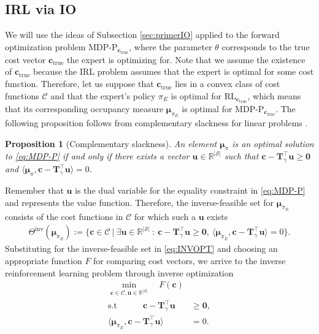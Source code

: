 \documentclass[10pt]{article} %
\newtheorem{proposition}{Proposition}
\def\C{\ensuremath{\mathcal{C}}}
\def\mTg{{\bm{T}}_\gamma}
\def\vzero{{\bm{0}}}
\def\vc{{\bm{c}}}
\def\vu{{\bm{u}}}
\def\vmu{{\bm{\mu}}}
\newcommand{\R}{\mathbb{R}}
\newcommand{\St}{\mathcal{S}}
\begin{document}
\subsection{IRL via IO}
We will use the ideas of Subsection \ref{sec:primerIO} applied to the forward optimization problem $\text{MDP-P}_{\vc_{\text{true}}}$, where the parameter $\theta$ corresponds to the true cost vector $\vc_{\text{true}}$ the expert is optimizing for. Note that we assume the existence of $\vc_{\text{true}}$ because the IRL problem assumes that the expert is optimal for some cost function. Therefore, let us suppose that $\vc_{\text{true}}$ lies in a convex class of cost functions $\C$ and that the expert's policy $\pi_E$ is optimal for $\text{RL}_{\vc_\text{true}}$, which means that its corresponding occupancy measure $\vmu_{\pi_E}$ is optimal for $\text{MDP-P}_{\vc_{\text{true}}}$. The following proposition follows from complementary slackness for linear problems \citep{Bertsimas1997}.
\begin{proposition}[Complementary slackness] \label{prop:complementaryslackness}
    An element $\vmu_{\pi}$ is an optimal solution to \eqref{eq:MDP-P} if and only if there exists a vector $\vu \in \R^{|\St|}$ such that $\vc - \mTg^\top \vu \geq \vzero$ and $\langle \vmu_{\pi}, \vc - \mTg^\top \vu \rangle = 0$.
\end{proposition}
Remember that $\vu$ is the dual variable for the equality constraint in \eqref{eq:MDP-P} and represents the value function. Therefore, the inverse-feasible set for $\vmu_{\pi_E}$ consists of the cost functions in $\C$ for which such a $\vu$ exists
\begin{align*}
    \Theta^{\text{inv}}(\vmu_{\pi_E}) := \{\vc \in \C \: | \: \exists \vu \in \R^{|\St|} \: : \: \vc - \mTg^\top \vu \geq \vzero, \: \langle \vmu_{\pi_E}, \vc - \mTg^\top \vu \rangle = 0\}.
\end{align*}
Substituting for the inverse-feasible set in \eqref{eq:INVOPT} and choosing an appropriate function $F$ for comparing cost vectors, we arrive to the inverse reinforcement learning problem through inverse optimization \citep{Erkin2010, Chan2023}
\begin{align*}
    \min\limits_{\vc\in \C, \vu \in \R^{|\St|} } \quad F(\vc)&
     \\
    \text{s.t} \quad \quad \quad  \vc - \mTg^\top \vu &\geq \vzero, \tag{IRL-IO} \label{eq:IO-IRL}\\
    \langle\vmu_{\pi_E}, \vc - \mTg^\top \vu  \rangle &= 0.
\end{align*}
\end{document}
